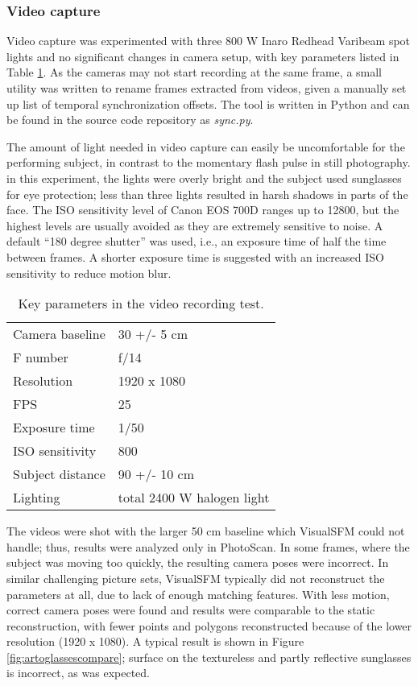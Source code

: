 \afterpage{\clearpage}
\subsubsection{Video capture}


Video capture was experimented with three 800 W Inaro Redhead Varibeam spot lights and no significant changes in camera setup, with key parameters listed in Table \ref{tab:samplevideoparams}.
As the cameras may not start recording at the same frame, a small utility was written to rename frames extracted from videos, given a manually set up list of temporal synchronization offsets.
The tool is written in Python and can be found in the source code repository as \emph{sync.py}.

The amount of light needed in video capture can easily be uncomfortable for the performing subject, in contrast to the momentary flash pulse in still photography.
in this experiment, the lights were overly bright and the subject used sunglasses for eye protection; less than three lights resulted in harsh shadows in parts of the face.
The ISO sensitivity level of Canon EOS 700D ranges up to 12800, but the highest levels are usually avoided as they are extremely sensitive to noise.
A default ``180 degree shutter'' was used, i.e., an exposure time of half the time between frames.
A shorter exposure time is suggested with an increased ISO sensitivity to reduce motion blur.

\begin{table}[b]
	\centering
	\begin{tabular}{l l}
		Camera baseline & 30 +/- 5 cm\\
		F number & f/14\\
		Resolution & 1920 x 1080\\
		FPS & 25\\
		Exposure time & 1/50\\
		ISO sensitivity & 800\\
		Subject distance & 90 +/- 10 cm\\
		Lighting & total 2400 W halogen light\\
	\end{tabular}
	\caption{
		Key parameters in the video recording test.
	}
	\label{tab:samplevideoparams}
\end{table}

The videos were shot with the larger 50 cm baseline which VisualSFM could not handle; thus, results were analyzed only in PhotoScan.
In some frames, where the subject was moving too quickly, the resulting camera poses were incorrect.
In similar challenging picture sets, VisualSFM typically did not reconstruct the parameters at all, due to lack of enough matching features.
With less motion, correct camera poses were found and results were comparable to the static reconstruction, with fewer points and polygons reconstructed because of the lower resolution (1920 x 1080).
A typical result is shown in Figure \ref{fig:artoglassescompare}; surface on the textureless and partly reflective sunglasses is incorrect, as was expected.


